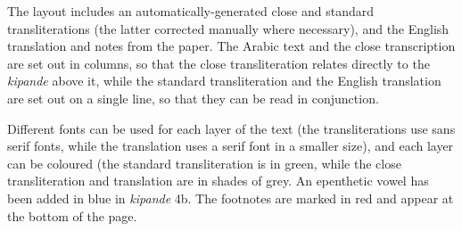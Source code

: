 The layout includes an automatically-generated close and standard transliterations (the latter corrected manually where necessary), and the English translation and notes from the paper.  The Arabic text and the close transcription are set out in columns, so that the close transliteration relates directly to the \textit{kipande} above it, while the standard transliteration and the English translation are set out on a single line, so that they can be read in conjunction.  

Different fonts can be used for each layer of the text (the transliterations use sans serif fonts, while the translation uses a serif font in a smaller size), and each layer can be coloured (the standard transliteration is in green, while the close transliteration and translation are in shades of grey.  An epenthetic vowel has been added in blue in \textit{kipande} 4b.  The footnotes are marked in red and appear at the bottom of the page.  

